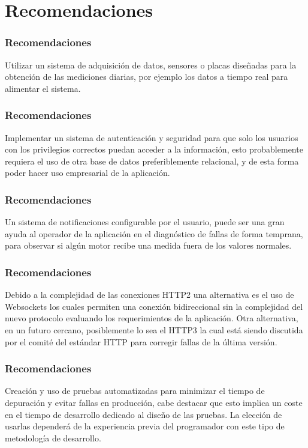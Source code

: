 \documentclass{beamer}
\begin{document}
\section{Recomendaciones}

\begin{frame}
    \frametitle{Recomendaciones}
    Utilizar un sistema de adquisición de datos, sensores o placas diseñadas
    para la obtención de las mediciones diarias, por ejemplo los datos a tiempo
    real para alimentar el sistema.

\end{frame}

\begin{frame}
    \frametitle{Recomendaciones}
        Implementar un sistema de autenticación y seguridad para que solo
    los usuarios con los
    privilegios correctos puedan acceder a la información, esto
    probablemente requiera el uso de otra base de datos preferiblemente
    relacional, y de esta forma poder hacer uso empresarial
    de la aplicación.
\end{frame}

\begin{frame}
    \frametitle{Recomendaciones}
    Un sistema de notificaciones configurable por el usuario,
    puede ser una gran ayuda al operador de la aplicación en el diagnóstico
    de fallas de forma temprana, para observar si algún motor recibe una
    medida fuera de los valores normales.
\end{frame}

\begin{frame}
    \frametitle{Recomendaciones}
    Debido a la complejidad de las conexiones HTTP2 una alternativa es el
    uso de Websockets los cuales permiten una conexión bidireccional sin la
    complejidad del nuevo protocolo evaluando  los requerimientos
    de la aplicación. Otra alternativa, en un futuro
    cercano, posiblemente lo sea el HTTP3 la cual está siendo discutida
    por el comité del estándar HTTP para corregir fallas de la última
    versión.
\end{frame}

\begin{frame}
    \frametitle{Recomendaciones}
    Creación y uso de  pruebas automatizadas para minimizar el tiempo de
    depuración y evitar fallas en producción, cabe destacar que esto
    implica un coste
    en el tiempo de desarrollo dedicado al diseño de las pruebas.
    La elección de usarlas dependerá de la experiencia previa
    del programador con este tipo de metodología de desarrollo.
\end{frame}
\end{document}
